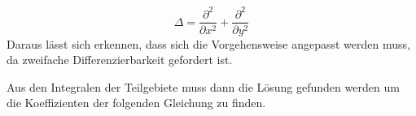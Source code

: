 \begin{equation}
	\Delta = \frac{\partial ^2}{\partial x^2} + \frac{\partial ^2}{\partial y^2}
\end{equation} 
Daraus lässt sich erkennen, dass sich die Vorgehensweise angepasst werden muss, da zweifache Differenzierbarkeit gefordert ist. %




 




Aus den Integralen der Teilgebiete muss dann die Lösung gefunden werden um die Koeffizienten der folgenden Gleichung zu finden.

